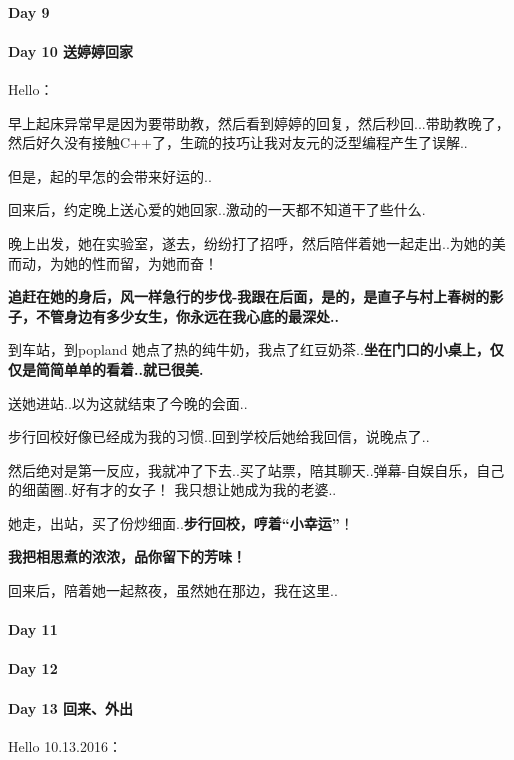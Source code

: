 \documentclass[UTF8,a4paper,8pt]{ctexbook}
\begin{document}
 	 \paragraph{Day 9       \quad     }
 	 \paragraph{Day 10   送婷婷回家   \quad     }
	 	 Hello：
	 	 
	 	 早上起床异常早是因为要带助教，然后看到婷婷的回复，然后秒回...带助教晚了，然后好久没有接触C++了，生疏的技巧让我对友元的泛型编程产生了误解..
	 	 
	 	 但是，起的早怎的会带来好运的..
	 	 
	 	 回来后，约定晚上送心爱的她回家..激动的一天都不知道干了些什么.
	 	 
	 	 晚上出发，她在实验室，遂去，纷纷打了招呼，然后陪伴着她一起走出..为她的美而动，为她的性而留，为她而奋！
	 	 
	 	 \textbf{追赶在她的身后，风一样急行的步伐-我跟在后面，是的，是直子与村上春树的影子，不管身边有多少女生，你永远在我心底的最深处..}
	 	 
	 	 到车站，到popland 她点了热的纯牛奶，我点了红豆奶茶..\textbf{坐在门口的小桌上，仅仅是简简单单的看着..就已很美.}
	 	 
	 	 送她进站..以为这就结束了今晚的会面..
	 	 
	 	 步行回校好像已经成为我的习惯..回到学校后她给我回信，说晚点了..
	 	 
	 	 然后绝对是第一反应，我就冲了下去..买了站票，陪其聊天..弹幕-自娱自乐，自己的细菌圈..好有才的女子！
	 	 我只想让她成为我的老婆..
	 	 
	 	 她走，出站，买了份炒细面..\textbf{步行回校，哼着“小幸运”}！
	 	 
	 	 \textbf{我把相思煮的浓浓，品你留下的芳味！}
	 	 
	 	 回来后，陪着她一起熬夜，虽然她在那边，我在这里..
 	 \paragraph{Day 11      \quad     }
 	 \paragraph{Day 12      \quad     }
 	 \paragraph{Day 13  回来、外出   \quad     }
	 	 Hello 10.13.2016：
	 	 
\end{document}
